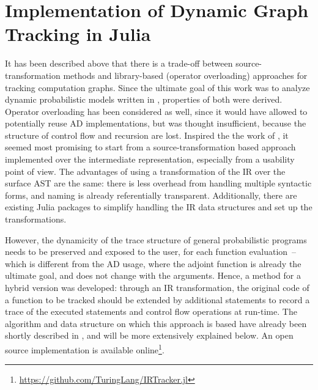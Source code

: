 \chapter{Implementation of Dynamic Graph Tracking in Julia}
\label{cha:impl-dynam-graph}

It has been described above that there is a trade-off between source-transformation methods and
library-based (operator overloading) approaches for tracking computation graphs.  Since the ultimate
goal of this work was to analyze dynamic probabilistic models written in \turingjl{}, properties of
both were derived.  Operator overloading has been considered as well, since it would have allowed to
potentially reuse AD implementations, but was thought insufficient, because the structure of control
flow and recursion are lost.  Inspired the the work of \textcite{innes2018don}, it seemed most
promising to start from a source-transformation based approach implemented over the intermediate
representation, especially from a usability point of view.  The advantages of using a transformation
of the IR over the surface AST are the same: there is less overhead from handling multiple syntactic
forms, and naming is already referentially transparent.  Additionally, there are existing Julia
packages to simplify handling the IR data structures and set up the transformations.

However, the dynamicity of the trace structure of general probabilistic programs needs to be
preserved and exposed to the user, for each function evaluation~-- which is different from the AD
usage, where the adjoint function is already the ultimate goal, and does not change with the
arguments.  Hence, a method for a hybrid version was developed: through an IR transformation, the
original code of a function to be tracked should be extended by additional statements to record a
trace of the executed statements and control flow operations at run-time.  The algorithm and data
structure on which this approach is based have already been shortly described in
\textcite{gabler2019graph}, and will be more extensively explained below.  An open source
implementation is available
online\footnote{\protect\url{https://github.com/TuringLang/IRTracker.jl}}.

